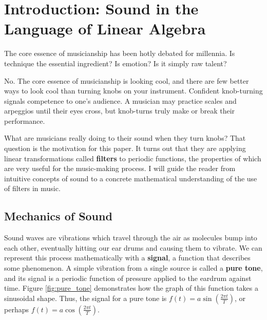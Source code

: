 
\section{Introduction: Sound in the Language of Linear Algebra}

\par \indentt The core essence of musicianship has been hotly debated for millennia. Is technique the essential ingredient? Is emotion? Is it simply raw talent?

\par \bigskip No. The core essence of musicianship is looking cool, and there are few better ways to look cool than turning knobs on your instrument. Confident knob-turning signals competence to one's audience. A musician may practice scales and arpeggios until their eyes cross, but knob-turns truly make or break their performance.

\par \bigskip What are musicians really doing to their sound when they turn knobs? That question is the motivation for this paper. It turns out that they are applying linear transformations called \textbf{filters} to periodic functions, the properties of which are very useful for the music-making process. I will guide the reader from intuitive concepts of sound to a concrete mathematical understanding of the use of filters in music.

\subsection{Mechanics of Sound}

\par \indentt Sound waves are vibrations which travel through the air as molecules bump into each other, eventually hitting our ear drums and causing them to vibrate. We can represent this process mathematically with a \textbf{signal}, a function that describes some phenomenon. A simple vibration from a single source is called a \textbf{pure tone}, and its signal is a periodic function of pressure applied to the eardrum against time. Figure \ref{fig:pure_tone} demonstrates how the graph of this function takes a sinusoidal shape.\cite{Pierce} Thus, the signal for a pure tone is $f(t) = a\sin(\frac{2\pi t}{T})$, or perhaps $f(t) = a\cos(\frac{2\pi t}{T})$. \\

